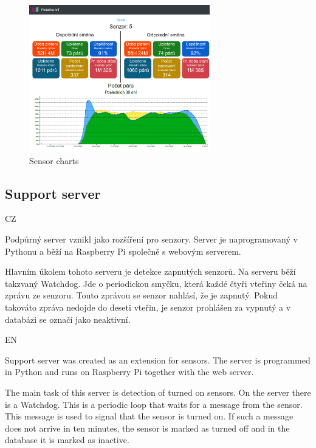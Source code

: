 \documentclass[12pt, a4paper]{article}
\begin{document}
\begin{figure}[t]
    \centering
    \includegraphics[width=0.7\textwidth]{img/prehled.png}
    \caption{Sensor charts}
    \label{fig:webSenzory}
\end{figure}


\subsection*{Support server}

CZ

Podpůrný server vznikl jako rozšíření pro senzory.
Server je naprogramovaný v Pythonu a běží na Raspberry Pi společně s webovým serverem.\newline

Hlavním úkolem tohoto serveru je detekce zapnutých senzorů.
Na serveru běží takzvaný Watchdog.
Jde o periodickou smyčku, která každé čtyři vteřiny čeká na zprávu ze senzoru.
Touto zprávou se senzor nahlásí, že je zapnutý. Pokud takováto zpráva nedojde do deseti vteřin, je senzor prohlášen za vypnutý a v databázi se označí jako neaktivní.

EN

Support server was created as an extension for sensors.
The server is programmed in Python and runs on Raspberry Pi together with the web server.\newline

The main task of this server is detection of turned on sensors.
On the server there is a Watchdog.
This is a periodic loop that waits for a message from the sensor.
This message is used to signal that the sensor is turned on.
If such a message does not arrive in ten minutes, the sensor is marked as turned off and in the database it is marked as inactive.
\end{document}
